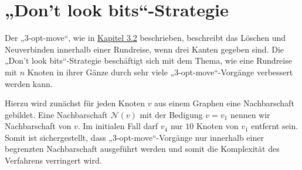 \section{„Don't look bits“-Strategie}
Der „3-opt-move“, wie in  \hyperref[ls3opt_func]{Kapitel 3.2} beschrieben, beschreibt das Löschen
und Neuverbinden innerhalb einer Rundreise, wenn drei
Kanten gegeben sind. Die „Don't look bits“-Strategie beschäftigt sich
mit dem Thema, wie eine Rundreise mit $n$ Knoten in ihrer Gänze durch
sehr viele „3-opt-move“-Vorgänge verbessert werden kann.

Hierzu wird zunächst für jeden Knoten $v$ aus einem Graphen
eine Nachbarschaft gebildet. Eine Nachbarschaft $\mathcal{N}(v)$ mit der
Bedigung $v = v_1$ nennen wir Nachbarschaft von $v$. Im initialen Fall 
darf $v_4$ nur $10$ Knoten von $v_1$
entfernt sein. Somit ist sichergestellt, dass „3-opt-move“-Vorgänge nur
innerhalb einer begrenzten Nachbarschaft ausgeführt werden und somit die
Komplexität des Verfahrens verringert wird.

